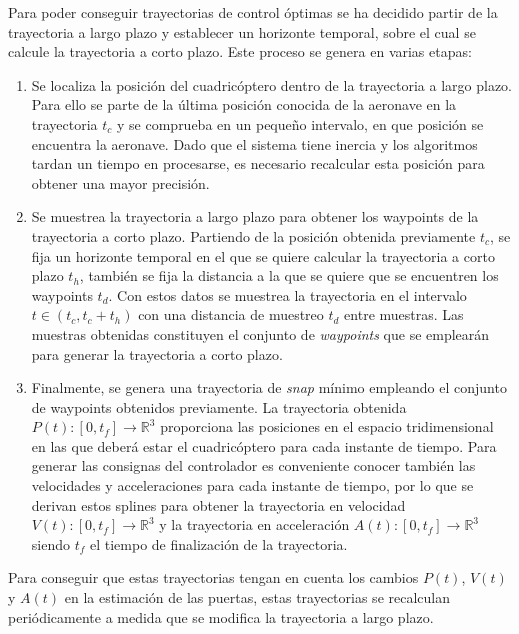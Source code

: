 Para poder conseguir trayectorias de control óptimas se ha decidido partir de la trayectoria a largo plazo y establecer un horizonte temporal, sobre el cual se calcule la trayectoria a corto plazo. Este proceso se genera en varias etapas:
\begin{enumerate}
	\item Se localiza la posición del cuadricóptero dentro de la trayectoria a largo plazo. Para ello se parte de la última posición conocida de la aeronave en la trayectoria $t_c$ y se comprueba en un pequeño intervalo, en que posición se encuentra la aeronave. Dado que el sistema tiene inercia y los algoritmos tardan un tiempo en procesarse, es necesario recalcular esta posición para obtener una mayor precisión.
	
	\item Se muestrea la trayectoria a largo plazo para obtener los waypoints de la trayectoria a corto plazo. Partiendo de la posición obtenida previamente $t_c$, se fija un horizonte temporal en el que se quiere calcular la trayectoria a corto plazo $t_h$, también se fija la distancia a la que se quiere que se encuentren los waypoints $t_d$. Con estos datos se  muestrea la trayectoria en el intervalo $t \in (t_c, t_c + t_h)$ con una distancia de muestreo $t_d$ entre muestras. Las muestras obtenidas constituyen el conjunto de \textit{waypoints} que se emplearán para generar la trayectoria a corto plazo.
	
	\item Finalmente, se genera una trayectoria de \textit{snap} mínimo empleando el conjunto de waypoints obtenidos previamente. La trayectoria obtenida $P(t) :[0,t_f] \rightarrow \mathbb{R}^3$ proporciona las posiciones en el espacio tridimensional en las que deberá estar el cuadricóptero para cada instante de tiempo. Para generar las consignas del controlador es conveniente conocer también las velocidades y acceleraciones para cada instante de tiempo, por lo que se derivan estos splines para obtener la trayectoria en velocidad $V(t) :[0,t_f] \rightarrow \mathbb{R}^3$ y la trayectoria en acceleración  $A(t) :[0,t_f] \rightarrow \mathbb{R}^3$ siendo $t_f$ el tiempo de finalización de la trayectoria.
\end{enumerate}

Para conseguir que estas trayectorias tengan en cuenta los cambios $P(t)$, $V(t)$ y $A(t)$ en la estimación de las puertas, estas trayectorias se recalculan periódicamente a medida que se modifica la trayectoria a largo plazo.

